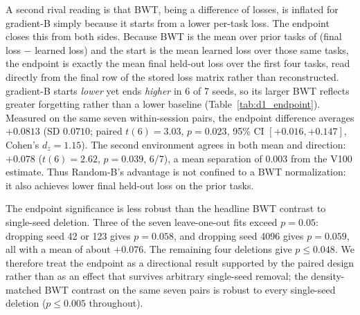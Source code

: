 A second rival reading is that BWT, being a difference of losses, is inflated for gradient-B simply because it starts from a lower per-task loss. The endpoint closes this from both sides. Because BWT is the mean over prior tasks of (final loss $-$ learned loss) and the start is the mean learned loss over those same tasks, the endpoint is exactly the mean final held-out loss over the first four tasks, read directly from the final row of the stored loss matrix rather than reconstructed. gradient-B starts \emph{lower} yet ends \emph{higher} in 6 of 7 seeds, so its larger BWT reflects greater forgetting rather than a lower baseline (Table~\ref{tab:d1_endpoint}). Measured on the same seven within-session pairs, the endpoint difference averages $+0.0813$ (SD $0.0710$; paired $t(6)=3.03$, $p=0.023$, 95\% CI $[+0.016,+0.147]$, Cohen's $d_z=1.15$). The second environment agrees in both mean and direction: $+0.078$ ($t(6)=2.62$, $p=0.039$, 6/7), a mean separation of $0.003$ from the V100 estimate. Thus Random-B's advantage is not confined to a BWT normalization: it also achieves lower final held-out loss on the prior tasks.

The endpoint significance is less robust than the headline BWT contrast to single-seed deletion. Three of the seven leave-one-out fits exceed $p=0.05$: dropping seed 42 or 123 gives $p=0.058$, and dropping seed 4096 gives $p=0.059$, all with a mean of about $+0.076$. The remaining four deletions give $p\leq0.048$. We therefore treat the endpoint as a directional result supported by the paired design rather than as an effect that survives arbitrary single-seed removal; the density-matched BWT contrast on the same seven pairs is robust to every single-seed deletion ($p\leq0.005$ throughout).

